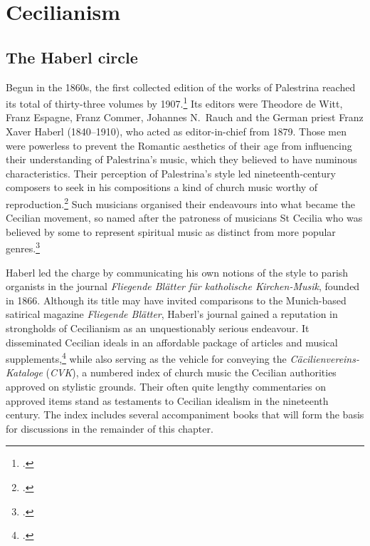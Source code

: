 \section{Cecilianism}
\label{sc:cecilianism}%
\subsection{The Haberl circle}
\label{sc:haberl_circle}%
Begun in the 1860s, the first collected edition of the works of Palestrina reached its total of thirty-three volumes by 1907.\footcite[150]{HayburnPapalLegislationSacred1979}
Its editors were Theodore de Witt, Franz Espagne, Franz Commer, Johannes N.\ Rauch and the German priest Franz Xaver Haberl (1840--1910), who acted as editor-in-chief from 1879.
Those men were powerless to prevent the Romantic aesthetics of their age from influencing their understanding of Palestrina's music, which they believed to have numinous characteristics.
Their perception of Palestrina's style led nineteenth-century composers to seek in his compositions a kind of church music worthy of reproduction.\footcite[2]{BayreutherSituationdeutschenKirchenmusik2010}
Such musicians organised their endeavours into what became the Cecilian movement, so named after the patroness of musicians St Cecilia who was believed by some to represent spiritual music as distinct from more popular genres.\footcites[5, 7]{Marchiwhomfireburns2015}[Some writers have expressed doubts about St Cecilia's true attachment to music. See, for instance,][570]{FloodStCeciliaMusic1923}

Haberl led the charge by communicating his own notions of the style to parish organists in the journal \emph{Fliegende Blätter für katholische Kirchen-Musik}, founded in 1866.
Although its title may have invited comparisons to the Munich-based satirical magazine \emph{Fliegende Blätter}, Haberl's journal gained a reputation in strongholds of Cecilianism as an unquestionably serious endeavour.
It disseminated Cecilian ideals in an affordable package of articles and musical supplements,\footcite[1]{WittAufruf1866} while also serving as the vehicle for conveying the \emph{Cäcilienvereins-Kataloge} (\emph{CVK}), a numbered index of church music the Cecilian authorities approved on stylistic grounds.
Their often quite lengthy commentaries on approved items stand as testaments to Cecilian idealism in the nineteenth century.
The index includes several accompaniment books that will form the basis for discussions in the remainder of this chapter.

